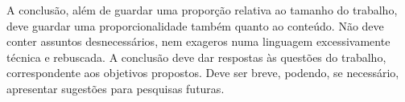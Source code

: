 \documentclass[a4paper,12pt]{article}
\begin{document}
\hspace{4ex}A conclusão, além de guardar uma proporção relativa ao tamanho do trabalho,
deve guardar uma proporcionalidade também quanto ao conteúdo. Não deve conter
assuntos desnecessários, nem exageros numa linguagem excessivamente técnica e
rebuscada. A conclusão deve dar respostas às questões do trabalho, correspondente aos
objetivos propostos. Deve ser breve, podendo, se necessário, apresentar sugestões para
pesquisas futuras.

\newpage




\appendix


\end{document}

